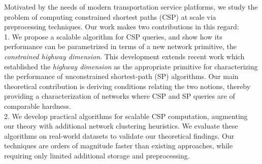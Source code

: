 Motivated by the needs of modern transportation service platforms, we study the problem of computing constrained shortest paths (CSP) at scale via preprocessing techniques.
Our work makes two contributions in this regard:\\
1. We propose a scalable algorithm for CSP queries, and show how its performance can be parametrized in terms of a new network primitive, the \emph{constrained highway dimension}. 
This development extends recent work which established the \emph{highway dimension} as the appropriate primitive for characterizing the performance of unconstrained shortest-path (SP) algorithms. 
Our main theoretical contribution is deriving conditions relating the two notions, thereby providing a characterization of networks where CSP and SP queries are of comparable hardness.\\
2. We develop practical algorithms for scalable CSP computation, augmenting our theory with additional network clustering heuristics. 
We evaluate these algorithms on real-world datasets to validate our theoretical findings. 
Our techniques are orders of magnitude faster than existing approaches, while requiring only limited additional storage and preprocessing.